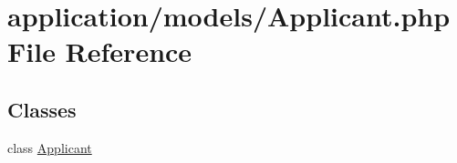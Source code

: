\hypertarget{_applicant_8php}{\section{application/models/\-Applicant.php File Reference}
\label{_applicant_8php}
}
\subsection*{Classes}
\begin{DoxyCompactItemize}
\item 
class \hyperlink{class_applicant}{Applicant}
\end{DoxyCompactItemize}
